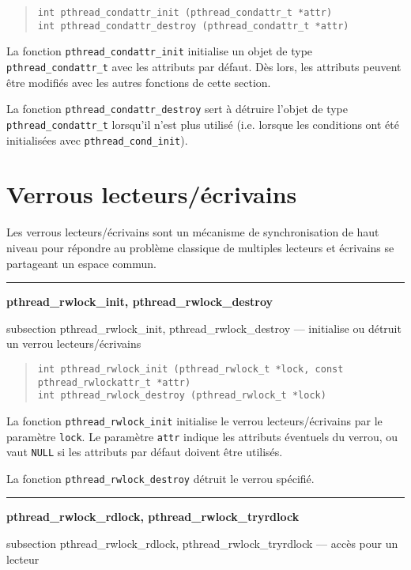\documentclass [twoside] {report}
\newcommand {\primitive} [1]
    {
	\phantomsection
	{\large \textbf {#1}}
	\addcontentsline {toc} {subsection} {#1}
    }
\newcommand {\separation}
    {
	\vspace {5mm}
	\nopagebreak
	\hrule
    }
\begin{document}
\begin {quote}
\begin {verbatim}
int pthread_condattr_init (pthread_condattr_t *attr)
int pthread_condattr_destroy (pthread_condattr_t *attr)
\end{verbatim}
\end {quote}

La fonction \verb|pthread_condattr_init| initialise un objet de type
\verb|pthread_condattr_t| avec les attributs par défaut. Dès lors,
les attributs peuvent être modifiés avec les autres fonctions de
cette section.

La fonction \verb|pthread_condattr_destroy| sert à détruire
l'objet de type \verb|pthread_condattr_t| lorsqu'il n'est plus
utilisé (i.e.  lorsque les conditions ont été initialisées avec
\verb|pthread_cond_init|).


\section {Verrous lecteurs/écrivains}

Les verrous lecteurs/écrivains sont un mécanisme de synchronisation de
haut niveau pour répondre au problème classique de multiples lecteurs
et écrivains se partageant un espace commun.

\separation
\primitive {pthread\_rwlock\_init, pthread\_rwlock\_destroy} --- initialise ou détruit un verrou lecteurs/écrivains

\begin {quote}
\begin {verbatim}
int pthread_rwlock_init (pthread_rwlock_t *lock, const pthread_rwlockattr_t *attr)
int pthread_rwlock_destroy (pthread_rwlock_t *lock)
\end{verbatim}
\end {quote}

La fonction \verb|pthread_rwlock_init| initialise le verrou
lecteurs/écrivains par le paramètre \texttt {lock}.  Le paramètre
\texttt {attr} indique les attributs éventuels du verrou, ou vaut
\texttt {NULL} si les attributs par défaut doivent être utilisés.

La fonction \verb|pthread_rwlock_destroy| détruit le verrou spécifié.


\separation
\primitive {pthread\_rwlock\_rdlock, pthread\_rwlock\_tryrdlock} --- accès pour un lecteur
\end{document}
